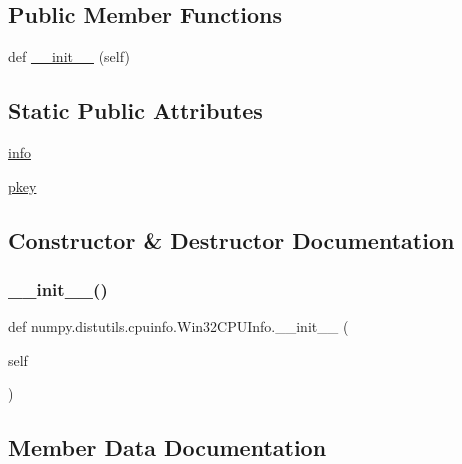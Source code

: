 \subsection*{Public Member Functions}
\begin{DoxyCompactItemize}
\item 
def \hyperlink{classnumpy_1_1distutils_1_1cpuinfo_1_1Win32CPUInfo_a5dfdeb4138117901afbb4ef8c0683a9e}{\+\_\+\+\_\+init\+\_\+\+\_\+} (self)
\end{DoxyCompactItemize}
\subsection*{Static Public Attributes}
\begin{DoxyCompactItemize}
\item 
\hyperlink{classnumpy_1_1distutils_1_1cpuinfo_1_1Win32CPUInfo_a912ef79056527655cfab3b4daeda3664}{info}
\item 
\hyperlink{classnumpy_1_1distutils_1_1cpuinfo_1_1Win32CPUInfo_a7db62c6ca23a436aec869bca93e4628c}{pkey}
\end{DoxyCompactItemize}


\subsection{Constructor \& Destructor Documentation}
\mbox{\label{classnumpy_1_1distutils_1_1cpuinfo_1_1Win32CPUInfo_a5dfdeb4138117901afbb4ef8c0683a9e}} 
\subsubsection{\texorpdfstring{\+\_\+\+\_\+init\+\_\+\+\_\+()}{\_\_init\_\_()}}
{\footnotesize\ttfamily def numpy.\+distutils.\+cpuinfo.\+Win32\+C\+P\+U\+Info.\+\_\+\+\_\+init\+\_\+\+\_\+ (\begin{DoxyParamCaption}\item[{}]{self }\end{DoxyParamCaption})}



\subsection{Member Data Documentation}
\mbox{\label{classnumpy_1_1distutils_1_1cpuinfo_1_1Win32CPUInfo_a912ef79056527655cfab3b4daeda3664}} 
